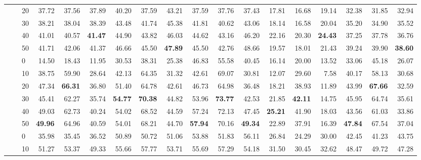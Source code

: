 \begin{table*}[!h]
{\begin{tabular}{lllrrr|rrr|rrr|rrr|rrr}
 \textbf{} & \textbf{} & 20 & 37.72 & 37.56 & 37.89 & 40.20 & 37.59 & 43.21 & 37.59 & 37.76 & 37.43 & 17.81 & 16.68 & 19.14 & 32.38 & 31.85 & 32.94 \\ 
 \textbf{} & \textbf{} & 30 & 38.21 & 38.04 & 38.39 & 43.48 & 41.74 & 45.38 & 41.81 & 40.62 & 43.06 & 18.14 & 16.58 & 20.04 & 35.20 & 34.90 & 35.52 \\ 
 \textbf{} & \textbf{} & 40 & 41.01 & 40.57 & \textbf{41.47} & 44.90 & 43.82 & 46.03 & 44.62 & 43.16 & 46.20 & 22.16 & 20.30 & \textbf{24.43} & 37.25 & 37.78 & 36.76 \\ 
 \textbf{} & \textbf{} & 50 & 41.71 & 42.06 & 41.37 & 46.66 & 45.50 & \textbf{47.89} & 45.50 & 42.76 & 48.66 & 19.57 & 18.01 & 21.43 & 39.24 & 39.90 & \textbf{38.60} \\ 
 \arrayrulecolor{gray}\cline{2-18}\arrayrulecolor{black}
\textbf{} & \textbf{\multirow{6}{*}{SC}} & 0 & 14.50 & 18.43 & 11.95 & 30.53 & 38.31 & 25.38 & 46.83 & 55.58 & 40.45 & 16.14 & 20.00 & 13.52 & 33.06 & 45.18 & 26.07 \\ 
 \textbf{} & \textbf{} & 10 & 38.75 & 59.90 & 28.64 & 42.13 & 64.35 & 31.32 & 42.61 & 69.07 & 30.81 & 12.07 & 29.60 & 7.58 & 40.17 & 58.13 & 30.68 \\ 
 \textbf{} & \textbf{} & 20 & 47.34 & \textbf{66.31} & 36.80 & 51.40 & 64.78 & 42.61 & 46.73 & 64.98 & 36.48 & 18.21 & 38.93 & 11.89 & 43.99 & \textbf{67.66} & 32.59 \\ 
 \textbf{} & \textbf{} & 30 & 45.41 & 62.27 & 35.74 & \textbf{54.77} & \textbf{70.38} & 44.82 & 53.96 & \textbf{73.77} & 42.53 & 21.85 & \textbf{42.11} & 14.75 & 45.95 & 64.74 & 35.61 \\ 
 \textbf{} & \textbf{} & 40 & 49.03 & 62.73 & 40.24 & 54.02 & 68.52 & 44.59 & 57.24 & 72.13 & 47.45 & \textbf{25.21} & 41.90 & 18.03 & 43.56 & 61.03 & 33.86 \\ 
 \textbf{} & \textbf{} & 50 & \textbf{49.96} & 64.96 & 40.59 & 54.01 & 68.21 & 44.70 & \textbf{57.94} & 70.16 & \textbf{49.34} & 22.89 & 37.91 & 16.39 & \textbf{47.84} & 67.54 & 37.04 \\ 
\hline
\arrayrulecolor{gray}\cline{2-18}\arrayrulecolor{black}
\textbf{\multirow{12}{*}{Gemma-2-27B}} & \textbf{\multirow{6}{*}{-}} & 0 & 35.98 & 35.45 & 36.52 & 50.89 & 50.72 & 51.06 & 53.88 & 51.83 & 56.11 & 26.84 & 24.29 & 30.00 & 42.45 & 41.23 & 43.75 \\ 
 \textbf{} & \textbf{} & 10 & 51.27 & 53.37 & 49.33 & 55.66 & 57.77 & 53.71 & 55.69 & 57.29 & 54.18 & 31.50 & 30.45 & 32.62 & 48.47 & 49.72 & 47.28 \\ 

\end{tabular}}
\end{table*}
